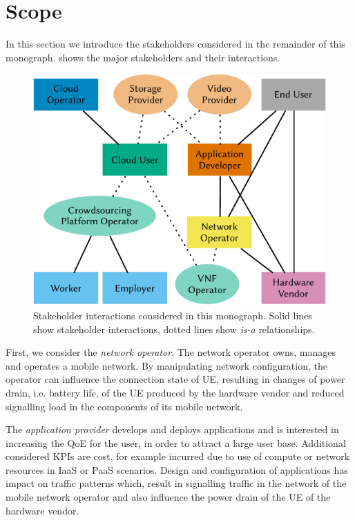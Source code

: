 \section{Scope}\label{sec:introduction:considered_stakeholders}

In this section we introduce the stakeholders considered in the remainder of this monograph.
 shows the major stakeholders and their interactions.

\begin{figure}
\centering
\includegraphics{figures/stakeholders}
\caption{Stakeholder interactions considered in this monograph. Solid lines show stakeholder interactions, dotted lines show \emph{is-a} relationships.}\label{fig:introduction:stakeholders}
\end{figure}

First, we consider the \emph{network operator}.
The network operator owns, manages and operates a mobile network.
By manipulating network configuration, the operator can influence the connection state of \gls{UE}, resulting in changes of power drain, i.e. battery life, of the \gls{UE} produced by the hardware vendor and reduced signalling load in the components of its mobile network.

The \emph{application provider} develops and deploys applications and is interested in increasing the \gls{QoE} for the user, in order to attract a large user base.
Additional considered \glspl{KPI} are cost, for example incurred due to use of compute or network resources in \gls{IaaS} or \gls{PaaS} scenarios.
Design and configuration of applications has impact on traffic patterns which, result in signalling traffic in the network of the mobile network operator and also influence the power drain of the \gls{UE} of the hardware vendor.

